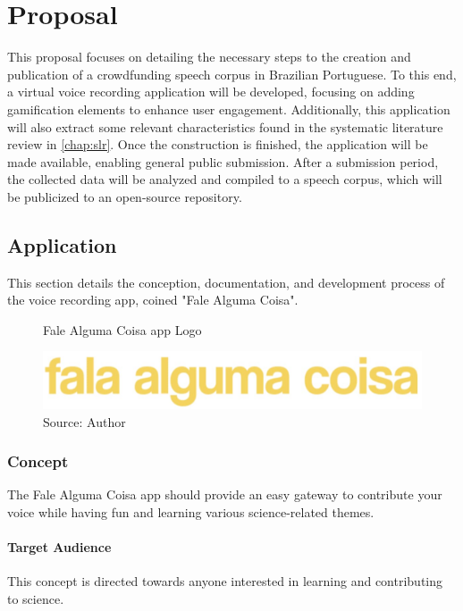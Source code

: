 \chapter[Proposal]{Proposal}

This proposal focuses on detailing the necessary steps to the creation and publication of a crowdfunding speech corpus in Brazilian Portuguese. To this end, a virtual voice recording application will be developed, focusing on adding gamification elements to enhance user engagement. Additionally, this application will also extract some relevant characteristics found in the systematic literature review in \ref{chap:slr}. Once the construction is finished, the application will be made available, enabling general public submission. After a submission period, the collected data will be analyzed and compiled to a speech corpus, which will be publicized to an open-source repository.

\section{Application}

This section details the conception, documentation, and development process of the voice recording app, coined "Fale Alguma Coisa".

\begin{figure}[ht]
    \centering
    \caption{Fale Alguma Coisa app Logo}
    \includegraphics[width=\linewidth/2]{images/app/logo.jpg}
    \caption*{Source: Author}
    \label{fig:foldit-solution}
\end{figure}

\subsection{Concept}

The Fale Alguma Coisa app should provide an easy gateway to contribute your voice while having fun and learning various science-related themes.

\subsubsection{Target Audience}

This concept is directed towards anyone interested in learning and contributing to science.

